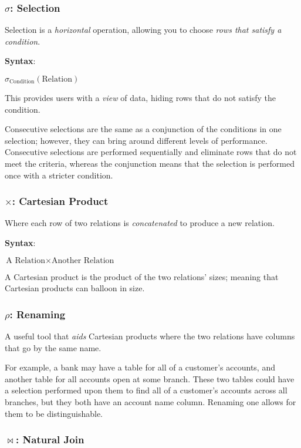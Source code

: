\documentclass{article}
\begin{document}
\subsubsection{$\sigma$: Selection}

Selection is a \textit{horizontal} operation, allowing you to choose \textit{rows that satisfy a condition}.

\textbf{Syntax}:

$\sigma_{\text{Condition}}(\text{Relation})$

This provides users with a \textit{view} of data, hiding rows that do not satisfy the condition.

Consecutive selections are the same as a conjunction of the conditions in one selection; however, they can bring around different levels of performance. Consecutive selections are performed sequentially and eliminate rows that do not meet the criteria, whereas the conjunction means that the selection is performed once with a stricter condition.

\subsubsection{$\times$: Cartesian Product}

Where each row of two relations is \textit{concatenated} to produce a new relation.

\textbf{Syntax}:

$\text{A Relation} \times \text{Another Relation}$

A Cartesian product is the product of the two relations' sizes; meaning that Cartesian products can balloon in size.

\subsubsection{$\rho$: Renaming}

A useful tool that \textit{aids} Cartesian products where the two relations have columns that go by the same name.

For example, a bank may have a table for all of a customer's accounts, and another table for all accounts open at some branch. These two tables could have a selection performed upon them to find all of a customer's accounts across all branches, but they both have an account name column. Renaming one allows for them to be distinguishable. 

\subsubsection{$\Join$: Natural Join}
\end{document}
